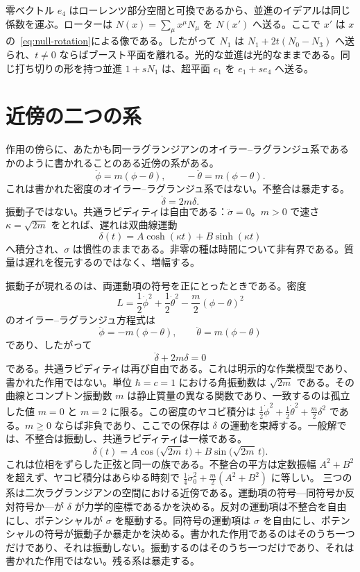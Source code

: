 \documentclass[a4paper]{article}
\begin{document}
零ベクトル \(e_4\) はローレンツ部分空間と可換であるから、並進のイデアルは同じ係数を運ぶ。ローターは \(N(x)=\sum_\mu x^\mu N_\mu\) を \(N(x')\) へ送る。ここで \(x'\) は \(x\) の~\eqref{eq:null-rotation}による像である。したがって \(N_1\) は \(N_1+2t(N_0-N_3)\) へ送られ、\(t\neq 0\) ならばブースト平面を離れる。光的な並進は光的なままである。同じ打ち切りの形を持つ並進 \(1+s N_1\) は、超平面 \(e_1\) を \(e_1+s e_4\) へ送る。

\section{近傍の二つの系}

作用の傍らに、あたかも同一ラグランジアンのオイラー--ラグランジュ系であるかのように書かれることのある近傍の系がある。
\begin{equation}
\ddot\phi=m(\phi-\theta),\qquad
-\ddot\theta=m(\phi-\theta).
\label{eq:claimed}
\end{equation}
これは書かれた密度のオイラー--ラグランジュ系ではない。不整合は暴走する。
\begin{equation}
\ddot\delta=2m\delta.
\label{eq:runaway}
\end{equation}
振動子ではない。共通ラピディティは自由である：\(\ddot\sigma=0\)。\(m>0\) で速さ \(\kappa=\sqrt{2m}\) をとれば、遅れは双曲線運動
\[
\delta(t)=A\cosh(\kappa t)+B\sinh(\kappa t)
\]
へ積分され、\(\sigma\) は慣性のままである。非零の種は時間について非有界である。質量は遅れを復元するのではなく、増幅する。

振動子が現れるのは、両運動項の符号を正にとったときである。密度
\[
L
  =\frac12\dot\phi^2
  +\frac12\dot\theta^2
  -\frac m2(\phi-\theta)^2
\]
のオイラー--ラグランジュ方程式は
\[
\ddot\phi=-m(\phi-\theta),\qquad
\ddot\theta=m(\phi-\theta)
\]
であり、したがって
\begin{equation}
\ddot\delta+2m\delta=0
\label{eq:oscillator}
\end{equation}
である。共通ラピディティは再び自由である。これは明示的な作業模型であり、書かれた作用ではない。単位 \(\hbar=c=1\) における角振動数は \(\sqrt{2m}\) である。その曲線とコンプトン振動数 \(m\) は静止質量の異なる関数であり、一致するのは孤立した値 \(m=0\) と \(m=2\) に限る。この密度のヤコビ積分は \(\frac12\dot\phi^2+\frac12\dot\theta^2+\frac m2\delta^2\) である。\(m\ge 0\) ならば非負であり、ここでの保存は \(\delta\) の運動を束縛する。一般解では、不整合は振動し、共通ラピディティは一様である。
\[
\delta(t)=A\cos\bigl(\sqrt{2m}\,t\bigr)+B\sin\bigl(\sqrt{2m}\,t\bigr).
\]
これは位相をずらした正弦と同一の族である。不整合の平方は定数振幅 \(A^2+B^2\) を超えず、ヤコビ積分はあらゆる時刻で \(\frac14\dot\sigma_0^2+\frac m2(A^2+B^2)\) に等しい。
三つの系は二次ラグランジアンの空間における近傍である。運動項の符号---同符号か反対符号か---が \(\delta\) が力学的座標であるかを決める。反対の運動項は不整合を自由にし、ポテンシャルが \(\sigma\) を駆動する。同符号の運動項は \(\sigma\) を自由にし、ポテンシャルの符号が振動子か暴走かを決める。書かれた作用であるのはそのうち一つだけであり、それは振動しない。振動するのはそのうち一つだけであり、それは書かれた作用ではない。残る系は暴走する。
\end{document}
